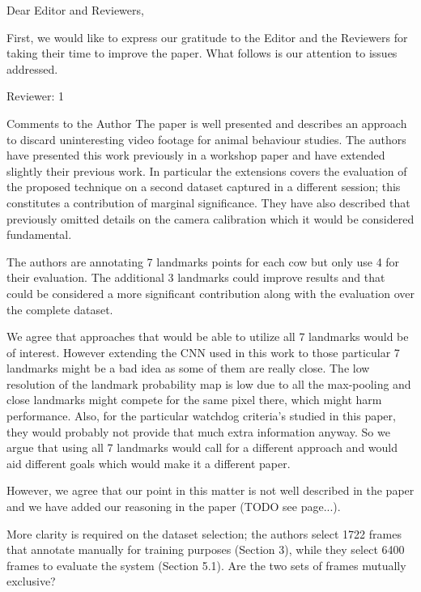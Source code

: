 \documentclass[10pt,a4paper]{letter}
\begin{document}
 
\begin{letter}{} 
\opening{Dear Editor and Reviewers,} 
 
First, we would like to express our gratitude to the Editor and the Reviewers for taking their time to
improve the paper. What follows is our attention to issues addressed.


\begin{siderules}
Reviewer: 1

Comments to the Author
The paper is well presented and describes an approach to discard uninteresting video footage for animal behaviour studies. 
The authors have presented this work previously in a workshop paper and have extended slightly their previous work. 
In particular the extensions covers the evaluation of the proposed technique on a second dataset captured in a different session; 
this constitutes a contribution of marginal significance. 
They have also described that previously omitted details on the camera calibration which it would be considered fundamental.

The authors are annotating 7 landmarks points for each cow but only use 4 for their evaluation. The additional 3 landmarks could improve 
results and that could be considered a more significant contribution along with the evaluation over the complete dataset.
\end{siderules}

We agree that approaches that would be able to utilize all 7 landmarks would be of interest. However extending the CNN
used in this work to those particular 7 landmarks might be a bad idea as some of them are really close. The low 
resolution of the landmark probability map is low due
to all the max-pooling and close landmarks might compete for the same pixel there, which might harm performance. 
Also, for the particular watchdog criteria's 
studied in this paper, they would probably not provide that much extra information anyway. So we argue that using all 7 landmarks 
would call for a different approach and would aid different goals which would make it a different paper.

However, we agree that our point in this matter is not well described in the paper and we have added our reasoning in the paper (TODO see page...).

\begin{siderules}
More clarity is required on the dataset selection; the authors select 1722 frames that annotate manually for training purposes (Section 3), 
while they select 6400 frames to evaluate the system (Section 5.1). Are the two sets of frames mutually exclusive?
\end{siderules}


\end{letter}
\end{document}
